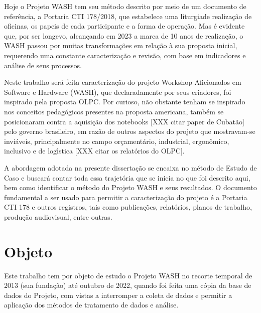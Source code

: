 \documentclass[
12pt,		%
openright,	%
twoside,  %
a4paper,			%
chapter=TITLE,		%
english,			%
french,				%
spanish,			%
brazil				%
]{USPSC-classe/USPSC_RedarTex}
\begin{document}
Hoje o Projeto WASH tem seu m\'etodo descrito por meio de um documento de refer\^encia, a Portaria CTI 178/2018, que estabelece uma \textquotedbl liturgia de realiza\c{c}\~ao de oficinas, os papeis de cada participante e a forma de opera\c{c}\~ao. Mas \'e evidente que, por ser longevo, alcan\c{c}ando em 2023 a marca de 10 anos de realiza\c{c}\~ao, o WASH passou por muitas transforma\c{c}\~oes em rela\c{c}\~ao \`a sua proposta inicial, requerendo uma constante caracteriza\c{c}\~ao e revis\~ao, com base em indicadores e an\'alise de seus processos.










Neste trabalho ser\'a feita caracteriza\c{c}\~ao do projeto Workshop Aficionados em Software e Hardware (WASH), que declaradamente por seus criadores, foi inspirado pela proposta OLPC. Por curioso, n\~ao obstante tenham se inspirado nos conceitos pedag\'ogicos presentes na proposta americana, tamb\'em se posicionaram contra a aquisi\c{c}\~ao dos notebooks [XXX citar paper de Cubat\~ao] pelo governo brasileiro, em raz\~ao de outros aspectos do projeto que mostravam-se invi\'aveis, principalmente no campo or\c{c}ament\'ario, industrial, ergon\^omico, inclusivo e de log\'{\i}stica [XXX citar os relat\'orios do OLPC].










A abordagem adotada na presente disserta\c{c}\~ao se encaixa no m\'etodo de \textquotedbl Estudo de Caso e buscar\'a contar toda essa trajet\'oria que se inicia no que foi descrito aqui, bem como identificar o m\'etodo do Projeto WASH e seus resultados. O documento fundamental a ser usado para permitir a caracteriza\c{c}\~ao do projeto \'e a Portaria CTI 178 e outros registros, tais como publica\c{c}\~oes, relat\'orios, planos de trabalho, produ\c{c}\~ao audiovisual, entre outras.










\section[Objeto]{Objeto}\label{Objeto}
Este trabalho tem por objeto de estudo o  Projeto WASH no recorte temporal de 2013 (sua funda\c{c}\~ao) at\'e outubro de 2022, quando foi feita uma c\'opia da base de dados do Projeto, com vistas a interromper a coleta de dados e permitir a aplica\c{c}\~ao dos m\'etodos de tratamento de dados e an\'alise.
\end{document}
